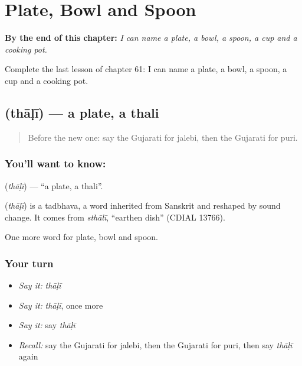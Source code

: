 
\chapter{Plate, Bowl and Spoon}
\label{ch:gu-plate-bowl-and-spoon}

\begin{chapteropening}
\textbf{By the end of this chapter:} \emph{I can name a plate, a bowl, a spoon, a cup and a cooking pot.}

Complete the last lesson of chapter 61: I can name a plate, a bowl, a spoon, a cup and a cooking pot.
\end{chapteropening}

\section[\texorpdfstring{\gu{થાળી} (thāḷī)}{થાળી (thāḷī)}]{ (thāḷī) — a plate, a thali}

\label{lesson:GU-C61-plate}



\begin{quote}
Before the new one: say the Gujarati for jalebi, then the Gujarati for puri.
\end{quote}

\subsection*{You'll want to know: }
\textbf{} (\emph{thāḷī}) — \textquotedblleft{}a plate, a thali\textquotedblright{}.

\begin{cousinweb}
\textbf{} (\emph{thāḷī}) is a tadbhava, a word inherited from Sanskrit and reshaped by sound change. It comes from \emph{sthālī}, \textquotedblleft{}earthen dish\textquotedblright{} (CDIAL 13766).
\end{cousinweb}

\begin{grammarlens}[title={What you've built}]
One more word for plate, bowl and spoon.
\end{grammarlens}

\subsection*{Your turn}
\begin{itemize}
\raggedright
  \item \emph{Say it:} \emph{thāḷī}
  \item \emph{Say it:} \emph{thāḷī}, once more
  \item \emph{Say it:} say \emph{thāḷī}
  \item \emph{Recall:} say the Gujarati for jalebi, then the Gujarati for puri, then say \emph{thāḷī} again
\end{itemize}

